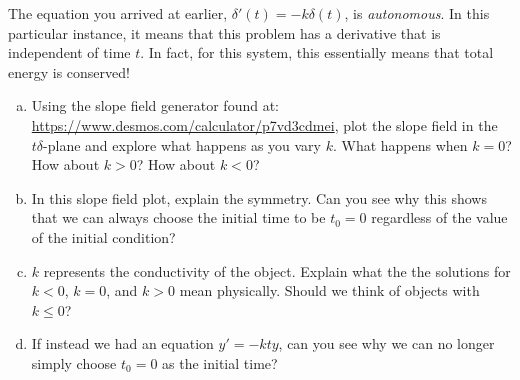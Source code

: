 \documentclass[12pt]{article} %
\begin{document}
\begin{problem}
    The equation you arrived at earlier, $\delta'(t) = -k\delta(t)$, is \emph{autonomous}.  In this particular instance, it means that this problem has a derivative that is independent of time $t$.  In fact, for this system, this essentially means that total energy is conserved! 
    \begin{enumerate}[(a)]
        \item Using the slope field generator found at: \url{https://www.desmos.com/calculator/p7vd3cdmei}, plot the slope field in the $t\delta$-plane and explore what happens as you vary $k$. What happens when $k=0$? How about $k>0$? How about $k<0$? 
        \item In this slope field plot, explain the symmetry.  Can you see why this shows that we can always choose the initial time to be $t_0=0$ regardless of the value of the initial condition? 
        \item $k$ represents the conductivity of the object.  Explain what the the solutions for $k<0$, $k=0$, and $k>0$ mean physically. Should we think of objects with $k\leq 0$?
        \item If instead we had an equation $y'=-kty$, can you see why we can no longer simply choose $t_0=0$ as the initial time?
    \end{enumerate}
\end{problem}  
\end{document}

